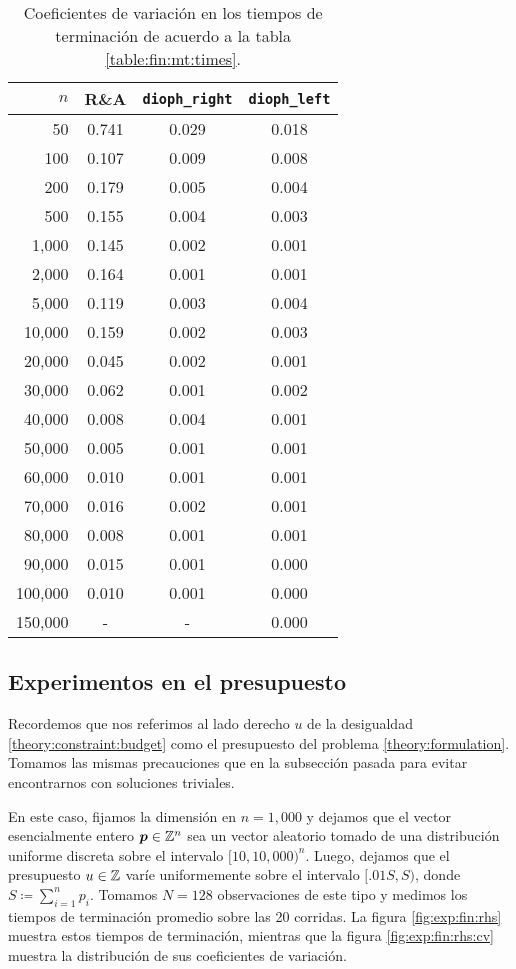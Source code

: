 \begin{table}
	\centering
	\begin{tabular}{rccc} \toprule
		$n$ & R\&A & \texttt{dioph\_right} & \texttt{dioph\_left} \\ \midrule
		50       &  0.741 & 0.029 & 0.018 \\
		100      &  0.107 & 0.009 & 0.008 \\
		200      &  0.179 & 0.005 & 0.004 \\
		500      &  0.155 & 0.004 & 0.003 \\ \midrule
		1,000     &  0.145 & 0.002 & 0.001 \\
		2,000     &  0.164 & 0.001 & 0.001 \\
		5,000     &  0.119 & 0.003 & 0.004 \\
		10,000    &  0.159 & 0.002 & 0.003 \\ \midrule
		20,000    &  0.045 & 0.002 & 0.001 \\
		30,000    &  0.062 & 0.001 & 0.002 \\
		40,000    &  0.008 & 0.004 & 0.001 \\
		50,000    &  0.005 & 0.001 & 0.001 \\ \midrule
		60,000    &  0.010 & 0.001 & 0.001 \\
		70,000    &  0.016 & 0.002 & 0.001 \\
		80,000    &  0.008 & 0.001 & 0.001 \\
		90,000    &  0.015 & 0.001 & 0.000 \\ \midrule
		100,000   &  0.010 & 0.001 & 0.000 \\
		150,000 & - & - & 0.000 \\ \bottomrule
	\end{tabular}
	\caption{Coeficientes de variación en los tiempos de terminación de acuerdo a la tabla
	\ref{table:fin:mt:times}.}
	\label{table:fin:mt:cv}
\end{table}

\subsection{Experimentos en el presupuesto}
\label{subsec:exp:fin:rhs}
\noindent
Recordemos que nos referimos al lado derecho $u$ de la desigualdad \eqref{theory:constraint:budget}
como el presupuesto del problema \eqref{theory:formulation}. Tomamos las mismas precauciones que en
la subsección pasada para evitar encontrarnos con soluciones triviales.

En este caso, fijamos la dimensión en $n = 1,000$ y dejamos que el vector esencialmente entero
$\boldsymbol{p} \in \mathbb{Z}^n$ sea un vector aleatorio tomado de una distribución uniforme discreta sobre el
intervalo $[10, 10,000)^n$. Luego, dejamos que el presupuesto $u \in \mathbb{Z}$ varíe uniformemente sobre el
intervalo $[.01S, S)$, donde $S \coloneq \sum_{i=1}^np_i$.
Tomamos $N = 128$ observaciones de este tipo y medimos los tiempos de terminación promedio sobre las
20 corridas. La figura \ref{fig:exp:fin:rhs} muestra estos tiempos de terminación, mientras que la figura
\ref{fig:exp:fin:rhs:cv} muestra la distribución de sus coeficientes de variación.

